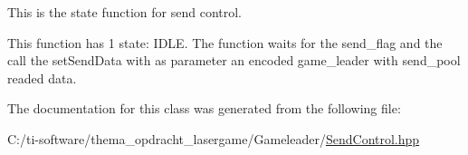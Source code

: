This is the state function for send control. 

This function has 1 state\+: I\+D\+LE. The function waits for the send\+\_\+flag and the call the set\+Send\+Data with as parameter an encoded game\+\_\+leader with send\+\_\+pool readed data. 

The documentation for this class was generated from the following file\+:\begin{DoxyCompactItemize}
\item 
C\+:/ti-\/software/thema\+\_\+opdracht\+\_\+lasergame/\+Gameleader/\mbox{\hyperlink{_send_control_8hpp}{Send\+Control.\+hpp}}\end{DoxyCompactItemize}
